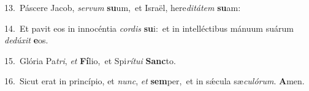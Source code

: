 {\numbfont\textcolor{\numbcolor}{13.}}~Páscere Jacob, \textit{ser}\-\textit{vum} \textbf{su}\-um,~\star et Israël, here\-\textit{di}\-\textit{tá}\textit{tem} \textbf{su}\-am:\par
{\numbfont\textcolor{\numbcolor}{14.}}~Et pavit eos in innocéntia \textit{cor}\-\textit{dis} \textbf{su}\-i:~\star et in intelléctibus mánuum suárum \textit{de}\-\textit{dú}\textit{xit} \textbf{e}\-os.\par
{\numbfont\textcolor{\numbcolor}{15.}}~Glória Pa\-\textit{tri}\-, \textit{et} \textbf{Fí}\-lio,~\star et Spi\-\textit{rí}\-\textit{tu}\textit{i} \textbf{Sanc}\-to.\par
{\numbfont\textcolor{\numbcolor}{16.}}~Sicut erat in princípio, et \textit{nunc}\-, \textit{et} \textbf{sem}\-per,~\star et in sǽcula sæ\-\textit{cu}\-\textit{ló}\textit{rum}. \textbf{A}\-men.\par
